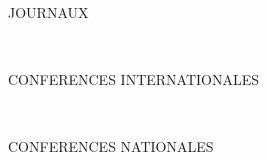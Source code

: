 

\manualmark
{} %
{}
\label{app:publications}



\begin{refsection}[ownpubs]
  \sloppy

  \noindent JOURNAUX
  \small
  \nocite{soulej2025jaamas}
  \nocite{soule2025roia}
  \printbibliography[keyword=journal, heading=none]

  \

  \noindent CONFERENCES INTERNATIONALES
  \small
  \nocite{soulej2025cloud}
  \nocite{soule2024moise_marl}
  \nocite{soule2024marl}
  \nocite{soulej2023sim}
  \printbibliography[keyword=international, heading=none]

  \

  \normalsize
  \noindent CONFERENCES NATIONALES
  \small
  \nocite{soule2025jfsma}
  \nocite{soule2024outil}
  \nocite{soule2024approche}
  \nocite{soule2023jfsmathese}
  \nocite{soule2023ressithese}
  \nocite{soule2023rjciathese}
  \printbibliography[keyword=national, heading=none]

\end{refsection}
\fussy
